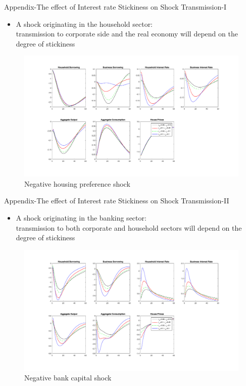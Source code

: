 \documentclass[8pt,aspectratio=169]{beamer}
\numberwithin{equation}{section}
\begin{document}
\begin{frame}{Appendix-The effect of Interest rate Stickiness on Shock Transmission-I}

\begin{itemize}
\item A shock originating in the household sector:\\
transmission to corporate side and the real economy will depend on the degree of stickiness
\end{itemize}    

\begin{figure}[H]
\centering
\caption{Negative housing preference shock}
\includegraphics[scale=0.3]{stickinessJ.pdf}
\end{figure}



\end{frame}



\begin{frame}{Appendix-The effect of Interest rate Stickiness on Shock Transmission-II}

\begin{itemize}
\item A shock originating in the banking sector: \\transmission to both corporate and household sectors will depend on the degree of stickiness
\end{itemize}    

\begin{figure}[H]
\centering
\caption{Negative bank capital shock}
\includegraphics[scale=0.3]{stickinessCAB.pdf}
\end{figure}


\end{frame}
\end{document}
